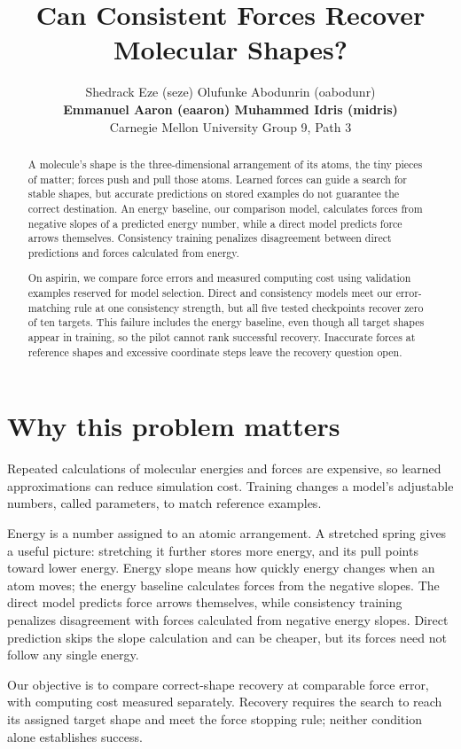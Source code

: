 \documentclass{article}
\title{Can Consistent Forces Recover Molecular Shapes?}
\author{Shedrack Eze (seze) \quad Olufunke Abodunrin (oabodunr)\\
\textbf{Emmanuel Aaron (eaaron) \quad Muhammed Idris (midris)}\\
Carnegie Mellon University \quad Group 9, Path 3}
\begin{document}
\maketitle
\begin{abstract}
A molecule's shape is the three-dimensional arrangement of its atoms, the tiny pieces of matter; forces push and pull those atoms. Learned forces can guide a search for stable shapes, but accurate predictions on stored examples do not guarantee the correct destination. An energy baseline, our comparison model, calculates forces from negative slopes of a predicted energy number, while a direct model predicts force arrows themselves. Consistency training penalizes disagreement between direct predictions and forces calculated from energy.

On aspirin, we compare force errors and measured computing cost using validation examples reserved for model selection. Direct and consistency models meet our error-matching rule at one consistency strength, but all five tested checkpoints recover zero of ten targets. This failure includes the energy baseline, even though all target shapes appear in training, so the pilot cannot rank successful recovery. Inaccurate forces at reference shapes and excessive coordinate steps leave the recovery question open.
\end{abstract}
\section{Why this problem matters}
Repeated calculations of molecular energies and forces are expensive, so learned approximations can reduce simulation cost. Training changes a model's adjustable numbers, called parameters, to match reference examples.

Energy is a number assigned to an atomic arrangement. A stretched spring gives a useful picture: stretching it further stores more energy, and its pull points toward lower energy. Energy slope means how quickly energy changes when an atom moves; the energy baseline calculates forces from the negative slopes. The direct model predicts force arrows themselves, while consistency training penalizes disagreement with forces calculated from negative energy slopes. Direct prediction skips the slope calculation and can be cheaper, but its forces need not follow any single energy.

Our objective is to compare correct-shape recovery at comparable force error, with computing cost measured separately. Recovery requires the search to reach its assigned target shape and meet the force stopping rule; neither condition alone establishes success.
\end{document}
